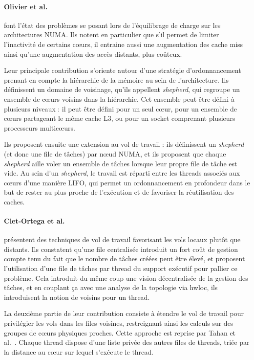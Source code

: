 \paragraph{Olivier et al.~\cite{Olivier2012, Olivier2013}} font l'état des problèmes se posant lors de l'équilibrage de charge sur les architectures NUMA.
Ils notent en particulier que s'il permet de limiter l'inactivité de certains cœurs, il entraine aussi une augmentation des cache miss ainsi qu'une augmentation des accès distants, plus coûteux.

Leur principale contribution s'oriente autour d'une stratégie d'ordonnancement prenant en compte la hiérarchie de la mémoire au sein de l'architecture.
Ils définissent un domaine de voisinage, qu'ils appellent \emph{shepherd}, qui regroupe un ensemble de cœurs voisins dans la hiérarchie.
Cet ensemble peut être défini à plusieurs niveaux : il peut être défini pour un seul cœur, pour un ensemble de cœurs partageant le même cache L3, ou pour un socket comprenant plusieurs processeurs multicœurs.

Ils proposent ensuite une extension au vol de travail : ils définissent un \emph{shepherd} (et donc une file de tâches) par nœud NUMA, et ils proposent que chaque \emph{shepherd} aille voler un ensemble de tâches lorsque leur propre file de tâche est vide.
Au sein d'un \emph{shepherd}, le travail est réparti entre les threads associés aux cœurs d'une manière LIFO, qui permet un ordonnancement en profondeur dans le but de rester au plus proche de l'exécution et de favoriser la réutilisation des caches.


\paragraph{Clet-Ortega et al.~\cite{Clet2014}} présentent des techniques de vol de travail favorisant les vols locaux plutôt que distants.
Ils constatent qu'une file centralisée introduit un fort coût de gestion compte tenu du fait que le nombre de tâches créées peut être élevé, et proposent l'utilisation d'une file de tâches par thread du support exécutif pour pallier ce problème.
Cela introduit du même coup une vision décentralisée de la gestion des tâches, et en couplant ça avec une analyse de la topologie via hwloc, ils introduisent la notion de voisins pour un thread.

La deuxième partie de leur contribution consiste à étendre le vol de travail pour privilégier les vols dans les files voisines, restreignant ainsi les calculs sur des groupes de cœurs physiques proches.
Cette approche est reprise par Tahan et al.~\cite{Tahan2014}. Chaque thread dispose d'une liste privée des autres files de threads, triée par la distance au cœur sur lequel s'exécute le thread.




